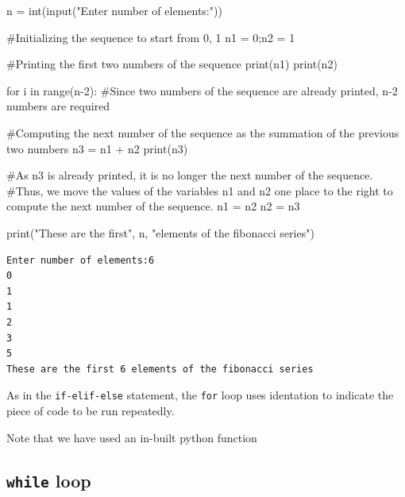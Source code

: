 \documentclass[
  letterpaper,
  DIV=11,
  numbers=noendperiod]{scrreprt}
\newenvironment{Shaded}{\begin{snugshade}}{\end{snugshade}}
\newcommand{\BuiltInTok}[1]{\textcolor[rgb]{0.00,0.23,0.31}{#1}}
\newcommand{\CommentTok}[1]{\textcolor[rgb]{0.37,0.37,0.37}{#1}}
\newcommand{\ControlFlowTok}[1]{\textcolor[rgb]{0.00,0.23,0.31}{#1}}
\newcommand{\DecValTok}[1]{\textcolor[rgb]{0.68,0.00,0.00}{#1}}
\newcommand{\KeywordTok}[1]{\textcolor[rgb]{0.00,0.23,0.31}{#1}}
\newcommand{\NormalTok}[1]{\textcolor[rgb]{0.00,0.23,0.31}{#1}}
\newcommand{\OperatorTok}[1]{\textcolor[rgb]{0.37,0.37,0.37}{#1}}
\newcommand{\StringTok}[1]{\textcolor[rgb]{0.13,0.47,0.30}{#1}}
\begin{document}
\begin{Shaded}
\begin{Highlighting}[]
\NormalTok{n }\OperatorTok{=} \BuiltInTok{int}\NormalTok{(}\BuiltInTok{input}\NormalTok{(}\StringTok{"Enter number of elements:"}\NormalTok{))}

\CommentTok{\#Initializing the sequence to start from 0, 1}
\NormalTok{n1 }\OperatorTok{=} \DecValTok{0}\OperatorTok{;}\NormalTok{n2 }\OperatorTok{=} \DecValTok{1}

\CommentTok{\#Printing the first two numbers of the sequence}
\BuiltInTok{print}\NormalTok{(n1)}
\BuiltInTok{print}\NormalTok{(n2)}

\ControlFlowTok{for}\NormalTok{ i }\KeywordTok{in} \BuiltInTok{range}\NormalTok{(n}\OperatorTok{{-}}\DecValTok{2}\NormalTok{):  }\CommentTok{\#Since two numbers of the sequence are already printed, n{-}2 numbers are required}
    
    \CommentTok{\#Computing the next number of the sequence as the summation of the previous two numbers}
\NormalTok{    n3 }\OperatorTok{=}\NormalTok{ n1 }\OperatorTok{+}\NormalTok{ n2}
    \BuiltInTok{print}\NormalTok{(n3)}
    
    \CommentTok{\#As \textquotesingle{}n3\textquotesingle{} is already printed, it is no longer the next number of the sequence. }
    \CommentTok{\#Thus, we move the values of the variables n1 and n2 one place to the right to compute the next number of the sequence.}
\NormalTok{    n1 }\OperatorTok{=}\NormalTok{ n2}
\NormalTok{    n2 }\OperatorTok{=}\NormalTok{ n3  }
    
\BuiltInTok{print}\NormalTok{(}\StringTok{"These are the first"}\NormalTok{, n, }\StringTok{"elements of the fibonacci series"}\NormalTok{)}
\end{Highlighting}
\end{Shaded}

\begin{verbatim}
Enter number of elements:6
0
1
1
2
3
5
These are the first 6 elements of the fibonacci series
\end{verbatim}

As in the \texttt{if-elif-else} statement, the \texttt{for} loop uses
identation to indicate the piece of code to be run repeatedly.

Note that we have used an in-built python function

\hypertarget{while-loop}{%
\subsection{\texorpdfstring{\texttt{while}
loop}{while loop}}\label{while-loop}}
\end{document}
